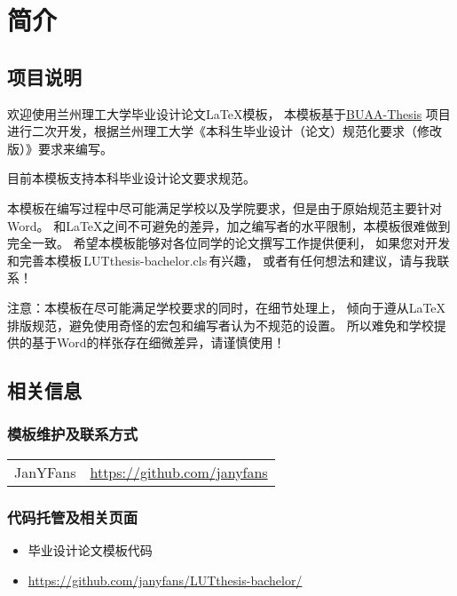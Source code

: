 \chapter{简介}

\section{项目说明}

	欢迎使用兰州理工大学毕业设计论文\LaTeX{}模板，
	本模板基于\href{https://github.com/BHOSC/BUAAthesis}{BUAA\hyp{}Thesis}
	项目进行二次开发，根据兰州理工大学《本科生毕业设计（论文）规范化要求（修改版）》要求来编写。
	
	目前本模板支持本科毕业设计论文要求规范。
	
	本模板在编写过程中尽可能满足学校以及学院要求，但是由于原始规范主要针对Word。
	和\LaTeX{}之间不可避免的差异，加之编写者的水平限制，本模板很难做到完全一致。
	希望本模板能够对各位同学的论文撰写工作提供便利，
	如果您对开发和完善本模板\,LUTthesis-bachelor.cls\,有兴趣，
	或者有任何想法和建议，请与我联系！
	
	{\heiti 注意：}本模板在尽可能满足学校要求的同时，在细节处理上，
	倾向于遵从\LaTeX{}排版规范，避免使用奇怪的宏包和编写者认为不规范的设置。
	所以难免和学校提供的基于Word的样张存在细微差异，请谨慎使用！

\section{相关信息}

\subsection{模板维护及联系方式}

	\begin{tabular}{ll}
		JanYFans & \url{https://github.com/janyfans}
	\end{tabular}

\subsection{代码托管及相关页面}

	\begin{itemize}
		\item 毕业设计论文模板代码
		\item[] \url{https://github.com/janyfans/LUTthesis-bachelor/}
	\end{itemize}
	
